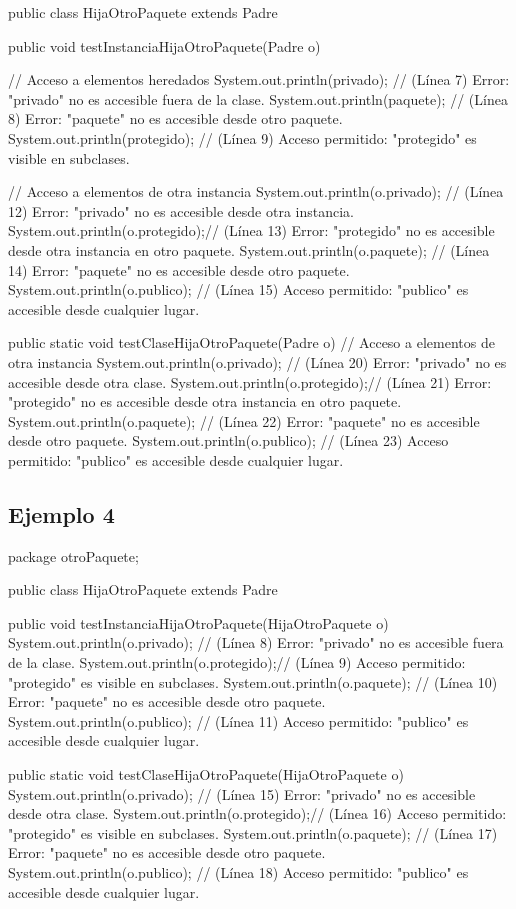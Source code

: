 \documentclass[a4paper,12pt]{article}
\begin{document}
public class HijaOtroPaquete extends Padre {

    public void testInstanciaHijaOtroPaquete(Padre o) {
        // Acceso a elementos heredados
        System.out.println(privado);    // (Línea 7) Error: "privado" no es accesible fuera de la clase.
        System.out.println(paquete);   // (Línea 8) Error: "paquete" no es accesible desde otro paquete.
        System.out.println(protegido); // (Línea 9) Acceso permitido: "protegido" es visible en subclases.

        // Acceso a elementos de otra instancia
        System.out.println(o.privado);   // (Línea 12) Error: "privado" no es accesible desde otra instancia.
        System.out.println(o.protegido);// (Línea 13) Error: "protegido" no es accesible desde otra instancia en otro paquete.
        System.out.println(o.paquete);  // (Línea 14) Error: "paquete" no es accesible desde otro paquete.
        System.out.println(o.publico);  // (Línea 15) Acceso permitido: "publico" es accesible desde cualquier lugar.
    }

    public static void testClaseHijaOtroPaquete(Padre o) {
        // Acceso a elementos de otra instancia
        System.out.println(o.privado);   // (Línea 20) Error: "privado" no es accesible desde otra clase.
        System.out.println(o.protegido);// (Línea 21) Error: "protegido" no es accesible desde otra instancia en otro paquete.
        System.out.println(o.paquete);  // (Línea 22) Error: "paquete" no es accesible desde otro paquete.
        System.out.println(o.publico);  // (Línea 23) Acceso permitido: "publico" es accesible desde cualquier lugar.
    }
}

\subsection{Ejemplo 4}

package otroPaquete;

public class HijaOtroPaquete extends Padre {

    public void testInstanciaHijaOtroPaquete(HijaOtroPaquete o) {
        System.out.println(o.privado);   // (Línea 8) Error: "privado" no es accesible fuera de la clase.
        System.out.println(o.protegido);// (Línea 9) Acceso permitido: "protegido" es visible en subclases.
        System.out.println(o.paquete);  // (Línea 10) Error: "paquete" no es accesible desde otro paquete.
        System.out.println(o.publico);  // (Línea 11) Acceso permitido: "publico" es accesible desde cualquier lugar.
    }

    public static void testClaseHijaOtroPaquete(HijaOtroPaquete o) {
        System.out.println(o.privado);   // (Línea 15) Error: "privado" no es accesible desde otra clase.
        System.out.println(o.protegido);// (Línea 16) Acceso permitido: "protegido" es visible en subclases.
        System.out.println(o.paquete);  // (Línea 17) Error: "paquete" no es accesible desde otro paquete.
        System.out.println(o.publico);  // (Línea 18) Acceso permitido: "publico" es accesible desde cualquier lugar.
    }
}
\end{document}

